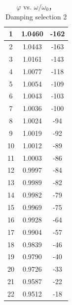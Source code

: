 \begin{table}[H]
\centering
\begin{tabular}{|c|c|c|}
\hline

1  & 1.0460  & -162  \\ \hline
2  & 1.0443  & -163  \\ \hline
3  & 1.0161  & -143  \\ \hline
4  & 1.0077  & -118  \\ \hline
5  & 1.0054  & -109  \\ \hline
6  & 1.0043  & -103  \\ \hline
7  & 1.0036  & -100  \\ \hline
8  & 1.0024  & -94   \\ \hline
9  & 1.0019  & -92   \\ \hline
10 & 1.0012  & -89   \\ \hline
11 & 1.0003  & -86   \\ \hline
12 & 0.9997  & -84   \\ \hline
13 & 0.9989  & -82   \\ \hline
14 & 0.9982  & -79   \\ \hline
15 & 0.9969  & -75   \\ \hline
16 & 0.9928  & -64   \\ \hline
17 & 0.9904  & -57   \\ \hline
18 & 0.9839  & -46   \\ \hline
19 & 0.9790  & -40   \\ \hline
20 & 0.9726  & -33   \\ \hline
21 & 0.9587  & -22   \\ \hline
22 & 0.9512  & -18   \\ \hline
\end{tabular}    
\caption{$\varphi$ vs. $\omega/\omega_0$， Damping selection 2}\label{data_phi2}
\end{table}

